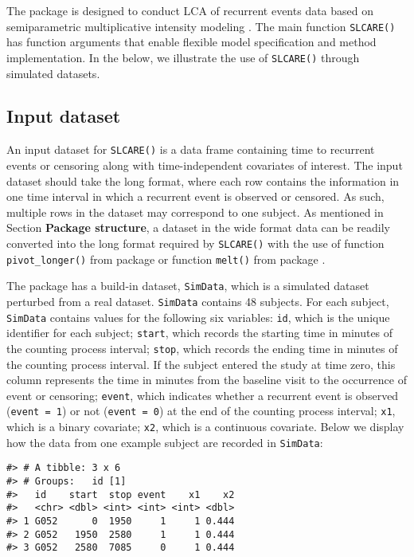 The package  is designed to conduct LCA of recurrent events data based on semiparametric multiplicative intensity modeling \citep{zhao2022semiparametric}.
The main function \texttt{SLCARE()} has function arguments that enable flexible model specification and method implementation. In the below, we illustrate the use of \texttt{SLCARE()} through simulated datasets.

\hypertarget{input-dataset}{%
\subsection{Input dataset}\label{input-dataset}}

An input dataset for \texttt{SLCARE()} is a data frame containing time to recurrent events or censoring along with time-independent covariates of interest.
The input dataset should take the long format, where each row contains the information in one time interval in which a recurrent event is observed or censored.
As such, multiple rows in the dataset may correspond to one subject.
As mentioned in Section \textbf{Package structure}, a dataset in the wide format data can be readily converted into the long format required by \texttt{SLCARE()} with the use of function \texttt{pivot\_longer()} from package  or function \texttt{melt()} from package .

The package  has a build-in dataset, \texttt{SimData}, which is a simulated dataset perturbed from a real
dataset. \texttt{SimData} contains 48 subjects. For each subject,
\texttt{SimData} contains values for the following six variables:
\texttt{id}, which is the unique identifier for each subject;
\texttt{start}, which records the starting time in minutes of the counting process interval;
\texttt{stop}, which records the ending time in minutes of the counting process interval. If the subject entered the study at time zero, this column represents the time in minutes from the baseline visit to the occurrence of event or censoring;
\texttt{event}, which indicates whether a recurrent event is observed (\texttt{event\ =\ 1}) or not (\texttt{event\ =\ 0}) at the end of the counting process interval;
\texttt{x1}, which is a binary covariate;
\texttt{x2}, which is a continuous covariate.
Below we display how the data from one example subject are recorded in \texttt{SimData}:

\begin{verbatim}
#> # A tibble: 3 x 6
#> # Groups:   id [1]
#>   id    start  stop event    x1    x2
#>   <chr> <dbl> <int> <int> <int> <dbl>
#> 1 G052      0  1950     1     1 0.444
#> 2 G052   1950  2580     1     1 0.444
#> 3 G052   2580  7085     0     1 0.444
\end{verbatim}

